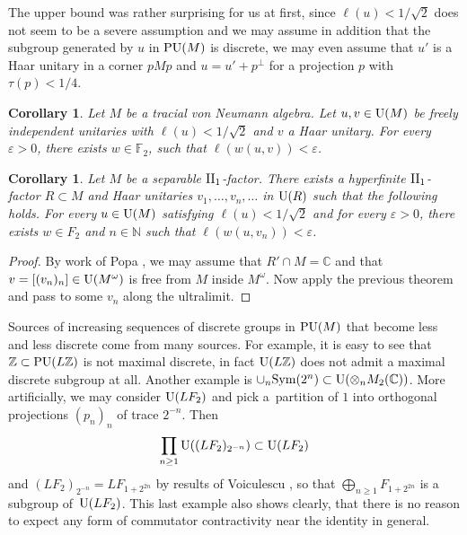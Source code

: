 \documentclass[pdftex]{sigma}
\numberwithin{equation}{section}
\newtheorem{Corollary}[Theorem]{Corollary}
\begin{document}
The upper bound was rather surprising for us at first, since $\ell(u)< 1/\sqrt{2}$ does not seem to be a severe assumption and we may assume in addition that the subgroup generated by $u$ in ${\rm PU}(M)$ is discrete, we may even assume that $u'$ is a Haar unitary in a corner $pMp$ and $u = u' + p^{\perp}$ for a projection $p$ with $\tau(p)<1/4$.

\begin{Corollary} Let $M$ be a tracial von Neumann algebra. Let $u,v \in {\rm U}(M)$ be freely independent unitaries with $\ell(u)<1/\sqrt{2}$ and $v$ a Haar unitary. For every $\varepsilon>0$, there exists $w \in \mathbb F_2$, such that $\ell(w(u,v))< \varepsilon$.
\end{Corollary}

\begin{Corollary}
Let $M$ be a separable ${\rm II}_1$-factor. There exists a hyperfinite ${\rm II}_1$-factor \mbox{$R \subset M$} and Haar unitaries $v_1,\dots,v_n,\dots$ in ${\rm U}(R)$ such that the following holds. For every $u \in {\rm U}(M)$ satisfying $\ell(u)< 1/\sqrt{2}$ and for every $\varepsilon>0$, there exists $w \in F_2$ and $n \in \mathbb N$ such that $\ell(w(u,v_n))< \varepsilon$.
\end{Corollary}
\begin{proof}
By work of Popa \cite{MR1372533}, we may assume that $R' \cap M= \mathbb C$ and that $v = [(v_n)_n] \in {\rm U}(M^{\omega})$ is free from $M$ inside $M^{\omega}$. Now apply the previous theorem and pass to some $v_n$ along the ultralimit. \end{proof}

\begin{Remark}
Sources of increasing sequences of discrete groups in ${\rm PU}(M)$ that become less and less discrete come from many sources. For example, it is easy to see that $\mathbb Z \subset {\rm PU}(L\mathbb Z)$ is not maximal discrete, in fact ${\rm U}(L\mathbb Z)$ does not admit a maximal discrete subgroup at all. Another example is $\cup_n {\rm Sym}(2^n) \subset {\rm U}(\otimes_n M_2(\mathbb C))$. More artificially, we may consider ${\rm U}(LF_2)$ and pick a~partition of $1$ into orthogonal projections $(p_n)_n$ of trace $2^{-n}$. Then
\begin{gather*}
\prod_{n\geq 1} {\rm U}((LF_2)_{2^{-n}}) \subset {\rm U}(LF_2)
\end{gather*}
and $(LF_2)_{2^{-n}} = LF_{1 + 2^{2n}}$ by results of Voiculescu \cite{MR1217253}, so that $\bigoplus_{n \geq 1} F_{1+2^{2n}}$ is a subgroup of~${\rm U}(LF_2)$. This last example also shows clearly, that there is no reason to expect any form of commutator contractivity near the identity in general.
\end{Remark}
\end{document}
